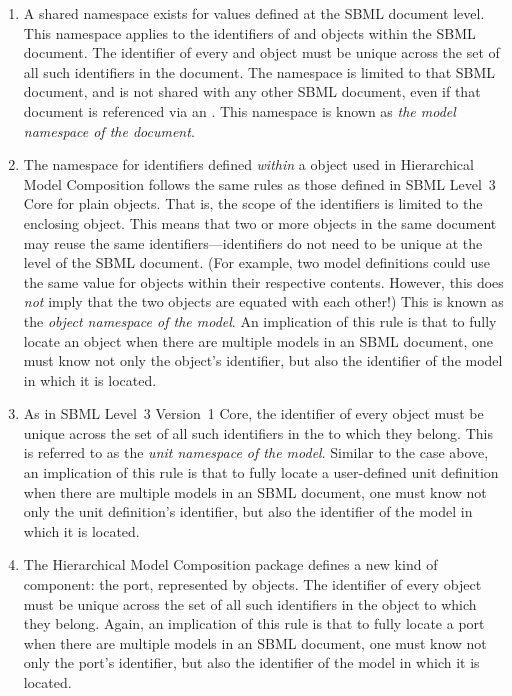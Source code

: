\begin{enumerate}

\item A shared namespace exists for  values defined at the
  SBML document level.  This namespace applies to the identifiers of
  \Model and \ExternalModelDefinition objects within the SBML document.
  The identifier of every \Model and \ExternalModelDefinition object
  must be unique across the set of all such identifiers in the document.
  The namespace is limited to that SBML document, and is not shared with
  any other SBML document, even if that document is referenced via an
  \ExternalModelDefinition.  This namespace is known as \emph{the model
    namespace of the document}.

\item The namespace for  identifiers defined \emph{within}
  a \Model object used in Hierarchical Model Composition follows the
  same rules as those defined in SBML Level~3 Core for plain \Model
  objects.  That is, the scope of the identifiers is limited to the
  enclosing \Model object.  This means that two or more \Model objects
  in the same document may reuse the same identifiers---identifiers do not need to be unique
  at the level of the SBML document.  (For example, two model
  definitions could use the same  value for
  \Parameter objects within their respective contents.  However, this
  does \emph{not} imply that the two objects are equated with each
  other!)  This is known as the \emph{object namespace of the model}.
  An implication of this rule is that to fully locate an object when
  there are multiple models in an SBML document, one must know not only
  the object's identifier, but also the identifier of the model in which
  it is located.

\item As in SBML Level~3 Version~1 Core, the identifier of every
  \UnitDefinition object must be unique across the set of all such
  identifiers in the \Model to which they belong.  This is referred to
  as the \emph{unit namespace of the model}.  Similar to the case above,
  an implication of this rule is that to fully locate a user-defined
  unit definition when there are multiple models in an SBML document,
  one must know not only the unit definition's identifier, but also the
  identifier of the model in which it is located.

\item The Hierarchical Model Composition package defines a new kind of
  component: the port, represented by \Port objects.  The identifier of
  every \Port object must be unique across the set of all such
  identifiers in the \Model object to which they belong.  Again, an
  implication of this rule is that to fully locate a port when there are
  multiple models in an SBML document, one must know not only the port's
  identifier, but also the identifier of the model in which it is
  located.


\end{enumerate}
